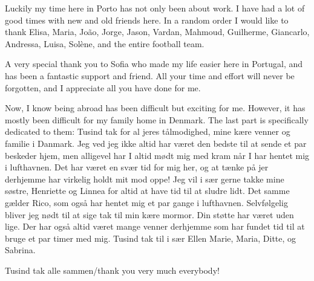 \documentclass[fleqn]{fcup-thesis}
\begin{document}
\begin{preliminary}
\begin{acknowledgements}
Luckily my time here in Porto has not only been about work. I have had a lot of good times with new
and old friends here. In a random order I would like to thank Elisa, Maria, João, Jorge, Jason,
Vardan, Mahmoud, Guilherme, Giancarlo, Andressa, Luisa, Solène, and the entire football team.

A very special thank you to Sofia who made my life easier here in Portugal, and has been a fantastic
support and friend. All your time and effort will never be forgotten, and I appreciate all you have
done for me.

Now, I know being abroad has been difficult but exciting for me. However, it has mostly been
difficult for my family home in Denmark. The last part is specifically dedicated to them: Tusind tak
for al jeres tålmodighed, mine kære venner og familie i Danmark. Jeg ved jeg ikke altid har været
den bedste til at sende et par beskeder hjem, men alligevel har I altid mødt mig med kram når I har
hentet mig i lufthavnen. Det har været en svær tid for mig her, og at tænke på jer derhjemme har
virkelig holdt mit mod oppe! Jeg vil i sær gerne takke mine søstre, Henriette og Linnea for altid at
have tid til at sludre lidt. Det samme gælder Rico, som også har hentet mig et par gange i
lufthavnen. Selvfølgelig bliver jeg nødt til at sige tak til min kære mormor. Din støtte har været
uden lige. Der har også altid været mange venner derhjemme som har fundet tid til at bruge et par
timer med mig. Tusind tak til i sær Ellen Marie, Maria, Ditte, og Sabrina.

\vspace{10}\noindent
Tusind tak alle sammen/thank you very much everybody!


\end{acknowledgements}



\begin{abstract}
\lipsum[2]
\end{abstract}

\begin{abstract-pt}
\lipsum[2]
\end{abstract-pt}



\tableofcontents
{}
\listoftables
{}
\listoffigures

\end{preliminary}










\appendix






% 


\nocite{} %
\end{document}
